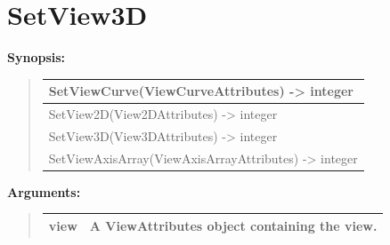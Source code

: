 \documentclass[letterpaper,10pt,english]{sphinxmanual}
\begin{document}
\begin{DUlineblock}{0em}
\item[] 
\end{DUlineblock}


\section{SetView3D}
\label{functions:setview3d}
\begin{DUlineblock}{0em}
\item[] \textbf{Synopsis:}
\end{DUlineblock}
\begin{quote}

\begin{tabulary}{\linewidth}{|L|}
\hline

SetViewCurve(ViewCurveAttributes) -\textgreater{} integer
\\
\hline
SetView2D(View2DAttributes) -\textgreater{} integer
\\
\hline
SetView3D(View3DAttributes) -\textgreater{} integer
\\
\hline
SetViewAxisArray(ViewAxisArrayAttributes) -\textgreater{} integer
\\
\hline\end{tabulary}

\end{quote}

\begin{DUlineblock}{0em}
\item[] 
\item[] \textbf{Arguments:}
\end{DUlineblock}
\begin{quote}

\begin{tabulary}{\linewidth}{|L|L|}
\hline

view
 & 
A ViewAttributes object containing the view.
\\
\hline\end{tabulary}

\end{quote}
\end{document}
